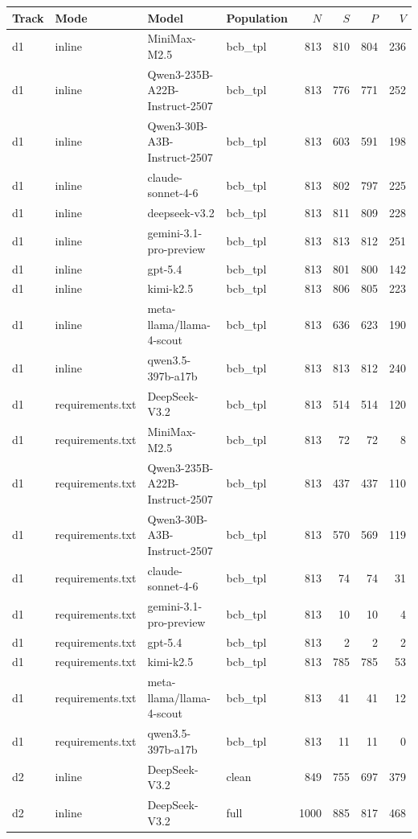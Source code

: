 \begin{tabular}{llllrrrr}
\toprule
Track & Mode & Model & Population & $N$ & $S$ & $P$ & $V$ \\
\midrule
d1 & inline & MiniMax-M2.5 & bcb\_tpl & 813 & 810 & 804 & 236 \\
d1 & inline & Qwen3-235B-A22B-Instruct-2507 & bcb\_tpl & 813 & 776 & 771 & 252 \\
d1 & inline & Qwen3-30B-A3B-Instruct-2507 & bcb\_tpl & 813 & 603 & 591 & 198 \\
d1 & inline & claude-sonnet-4-6 & bcb\_tpl & 813 & 802 & 797 & 225 \\
d1 & inline & deepseek-v3.2 & bcb\_tpl & 813 & 811 & 809 & 228 \\
d1 & inline & gemini-3.1-pro-preview & bcb\_tpl & 813 & 813 & 812 & 251 \\
d1 & inline & gpt-5.4 & bcb\_tpl & 813 & 801 & 800 & 142 \\
d1 & inline & kimi-k2.5 & bcb\_tpl & 813 & 806 & 805 & 223 \\
d1 & inline & meta-llama/llama-4-scout & bcb\_tpl & 813 & 636 & 623 & 190 \\
d1 & inline & qwen3.5-397b-a17b & bcb\_tpl & 813 & 813 & 812 & 240 \\
d1 & requirements.txt & DeepSeek-V3.2 & bcb\_tpl & 813 & 514 & 514 & 120 \\
d1 & requirements.txt & MiniMax-M2.5 & bcb\_tpl & 813 & 72 & 72 & 8 \\
d1 & requirements.txt & Qwen3-235B-A22B-Instruct-2507 & bcb\_tpl & 813 & 437 & 437 & 110 \\
d1 & requirements.txt & Qwen3-30B-A3B-Instruct-2507 & bcb\_tpl & 813 & 570 & 569 & 119 \\
d1 & requirements.txt & claude-sonnet-4-6 & bcb\_tpl & 813 & 74 & 74 & 31 \\
d1 & requirements.txt & gemini-3.1-pro-preview & bcb\_tpl & 813 & 10 & 10 & 4 \\
d1 & requirements.txt & gpt-5.4 & bcb\_tpl & 813 & 2 & 2 & 2 \\
d1 & requirements.txt & kimi-k2.5 & bcb\_tpl & 813 & 785 & 785 & 53 \\
d1 & requirements.txt & meta-llama/llama-4-scout & bcb\_tpl & 813 & 41 & 41 & 12 \\
d1 & requirements.txt & qwen3.5-397b-a17b & bcb\_tpl & 813 & 11 & 11 & 0 \\
d2 & inline & DeepSeek-V3.2 & clean & 849 & 755 & 697 & 379 \\
d2 & inline & DeepSeek-V3.2 & full & 1000 & 885 & 817 & 468 \\

\end{tabular}
